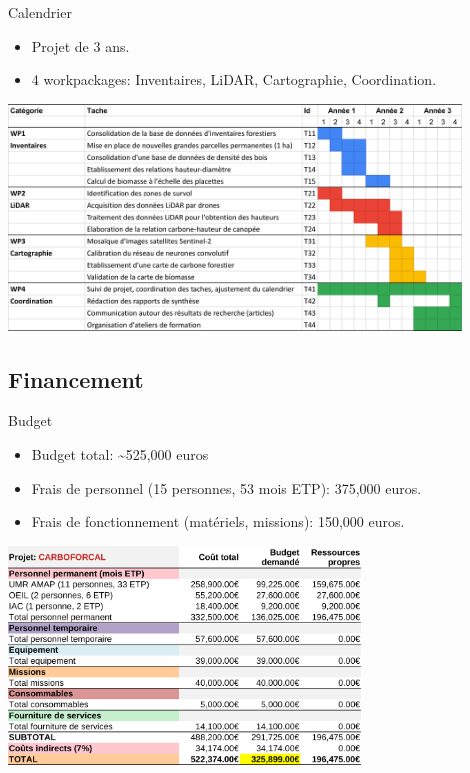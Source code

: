 \documentclass[10pt,table,dvipsnames,compress]{beamer}
\begin{document}
\begin{frame}[label={sec:org2acca48}]{Calendrier}
\begin{itemize}
\item Projet de 3 ans.
\item 4 workpackages: Inventaires, LiDAR, Cartographie, Coordination.
\end{itemize}

\begin{center}
\includegraphics[width=0.9\textwidth]{tabs/diagramme-gantt.png}
\end{center}
\end{frame}

\subsection{Financement}
\label{sec:org8193605}

\begin{frame}[label={sec:org9ddd122}]{Budget}
\begin{itemize}
\item Budget total: \textasciitilde{}525,000 euros
\item Frais de personnel (15 personnes, 53 mois ETP): 375,000 euros.
\item Frais de fonctionnement (matériels, missions): 150,000 euros.
\end{itemize}

\begin{center}
\includegraphics[width=0.7\textwidth]{tabs/budget_Projet.png}
\end{center}
\end{frame}
\end{document}

